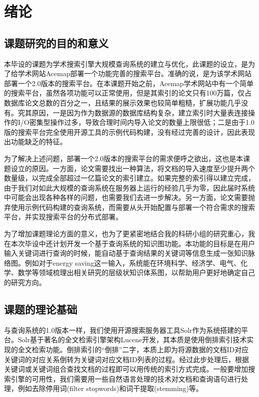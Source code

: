 
\chapter{绪论}
\label{chap:c1}

\section{课题研究的目的和意义}

本毕设的课题为学术搜索引擎大规模查询系统的建立与优化，此课题的设立，是为了给学术网站Acemap部署一个功能完善的搜索平台。准确的说，是为该学术网站部署一个2.0版本的搜索平台。在本课题开始之前，Acemap学术网站中有一个简单的搜索平台，虽然各项功能可以正常使用，但是其索引的论文只有100万篇，仅占数据库论文总数的百分之一，且结果的展示效果也较简单粗糙，扩展功能几乎没有。究其原因，一是因为作为数据源的数据库结构复杂，建立索引时大量表连接操作的I/O密集型操作过多，导致合理时间内导入论文的数量上限很低；二是由于1.0版的搜索平台完全使用开源工具的示例代码构建，没有经过完善的设计，因此表现出功能缺乏的特征。

为了解决上述问题，部署一个2.0版本的搜索平台的需求便呼之欲出，这也是本课题设立的原因。一方面，论文需要找出一种算法，将文档的导入速度至少提升两个数量级，以完成全部超过一亿篇论文的索引建立。如果完整的索引得以建立完成，由于我们对如此大规模的查询系统在服务器上运行的经验几乎为零，因此届时系统中可能会出现各种各样的问题，也需要我们去进一步解决。另一方面，论文需要抛弃使用示例代码构建的查询系统，而需要从头开始配置与部署一个符合需求的搜索平台，并实现搜索平台的分布式部署。

为了增加课题理论方面的意义，也为了更紧密地结合我的科研小组的研究重心，我在本次毕设中还计划开发一个基于查询系统的知识图功能。本功能的目标是在用户输入关键词进行查询的时候，能自动基于查询结果的关键词等信息生成一张知识脉络图。例如对于energy saving这一输入，系统能在环境科学、经济学、电气、化学、数学等领域梳理出相关研究的层级状知识体系图，以帮助用户更好地确定自己的研究方向。

\section{课题的理论基础}

与查询系统的1.0版本一样，我们使用开源搜索服务器工具Solr作为系统搭建的平台。Solr基于著名的全文检索引擎架构Lucene开发，其本质是使用倒排索引技术实现的全文检索功能。倒排索引的“倒排”二字，本质上即为将源数据的文档ID对应关键词的对应关系倒转为关键词对应文档ID列表的过程。经过此步处理后，根据关键词或关键词组合查找文档的过程即可以用传统的索引方式完成。一般要增加搜索引擎的可用性，我们需要用一些自然语言处理的技术对文档和查询语句进行处理，例如去除停用词(filter stopwords)和词干提取(stemming)等。

